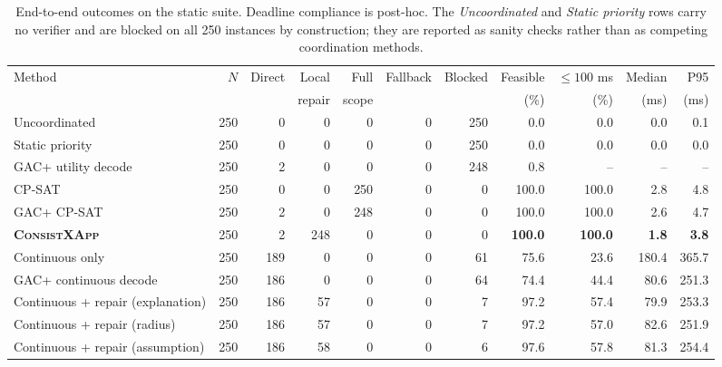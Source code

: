 \documentclass[pdflatex,sn-mathphys-num,iicol,oneside]{sn-jnl}
\newcommand{\method}{\textsc{ConsistXApp}\xspace}
\newcommand{\gac}{\textsc{GAC}\xspace}
\newcommand{\cpsat}{\textsc{CP-SAT}\xspace}
\begin{document}
\begin{table}[t]
\centering
\caption{
End-to-end outcomes on the static suite. Deadline compliance is
post-hoc. The \emph{Uncoordinated} and \emph{Static priority} rows
carry no verifier and are blocked on all 250 instances by
construction; they are reported as sanity checks rather than as
competing coordination methods.
}
\label{tab:main-results}
\setlength{\tabcolsep}{3pt}
\footnotesize

\begin{tabular}{lrrrrrrrrrr}
\toprule
Method &
$N$ &
Direct &
Local &
Full &
Fallback &
Blocked &
Feasible &
$\leq100$ ms &
Median &
P95\\
&
&
&
repair &
scope &
&
&
(\%) &
(\%) &
(ms) &
(ms)\\
\midrule

Uncoordinated
& 250 & 0 & 0 & 0 & 0 & 250 & 0.0 & 0.0 & 0.0 & 0.1\\

Static priority
& 250 & 0 & 0 & 0 & 0 & 250 & 0.0 & 0.0 & 0.0 & 0.0\\

\gac + utility decode
& 250 & 2 & 0 & 0 & 0 & 248 & 0.8 & -- & -- & --\\

\cpsat
& 250 & 0 & 0 & 250 & 0 & 0 & 100.0 & 100.0 & 2.8 & 4.8\\

\gac + \cpsat
& 250 & 2 & 0 & 248 & 0 & 0 & 100.0 & 100.0 & 2.6 & 4.7\\

\textbf{\method}
& 250 & 2 & 248 & 0 & 0 & 0 &
\textbf{100.0} &
\textbf{100.0} &
\textbf{1.8} &
\textbf{3.8}\\

\midrule

Continuous only
& 250 & 189 & 0 & 0 & 0 & 61 & 75.6 & 23.6 & 180.4 & 365.7\\

\gac + continuous decode
& 250 & 186 & 0 & 0 & 0 & 64 & 74.4 & 44.4 & 80.6 & 251.3\\

Continuous + repair (explanation)
& 250 & 186 & 57 & 0 & 0 & 7 & 97.2 & 57.4 & 79.9 & 253.3\\

Continuous + repair (radius)
& 250 & 186 & 57 & 0 & 0 & 7 & 97.2 & 57.0 & 82.6 & 251.9\\

Continuous + repair (assumption)
& 250 & 186 & 58 & 0 & 0 & 6 & 97.6 & 57.8 & 81.3 & 254.4\\

\bottomrule
\end{tabular}
\normalsize
\end{table}
\end{document}
